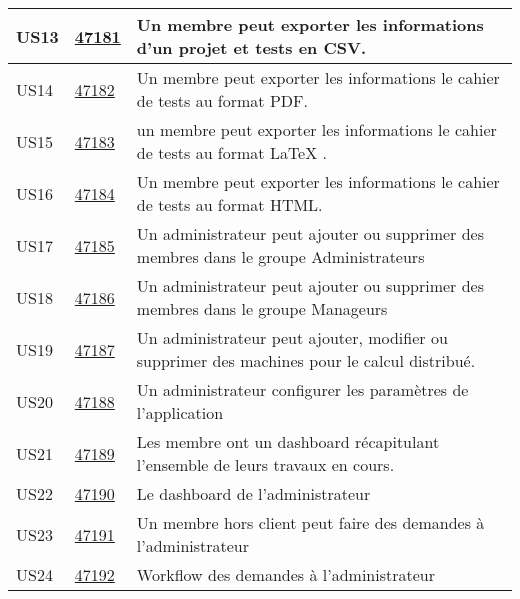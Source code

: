 \begin{center}
\begin{tabular}{|l|p{1.5cm}|p{14cm}|}
        \hline
US13	&	\href{https://redmine-projets.smile.fr/issues/47181}{47181}	&	Un membre peut exporter les informations d'un projet et tests en CSV.	                        \\
        \hline
US14	&	\href{https://redmine-projets.smile.fr/issues/47182}{47182}	&	Un membre peut exporter les informations le cahier de tests au format PDF.	                    \\
        \hline
US15	&	\href{https://redmine-projets.smile.fr/issues/47183}{47183}	&	un membre peut exporter les informations le cahier de tests au format LaTeX .	                \\
        \hline
US16	&	\href{https://redmine-projets.smile.fr/issues/47184}{47184}	&	Un membre peut exporter les informations le cahier de tests au format HTML.	                    \\
        \hline
US17	&	\href{https://redmine-projets.smile.fr/issues/47185}{47185}	&	Un administrateur peut ajouter ou supprimer des membres dans le groupe Administrateurs	        \\
        \hline
US18	&	\href{https://redmine-projets.smile.fr/issues/47186}{47186}	&	Un administrateur peut ajouter ou supprimer des membres dans le groupe Manageurs	            \\
        \hline
US19	&	\href{https://redmine-projets.smile.fr/issues/47187}{47187}	&	Un administrateur peut ajouter, modifier ou supprimer des machines pour le calcul distribué.	\\
        \hline
US20	&	\href{https://redmine-projets.smile.fr/issues/47188}{47188}	&	Un administrateur configurer les paramètres de l'application	                                \\
        \hline
US21	&	\href{https://redmine-projets.smile.fr/issues/47189}{47189}	&	Les membre ont un dashboard récapitulant l'ensemble de leurs travaux en cours.	                \\
        \hline
US22	&	\href{https://redmine-projets.smile.fr/issues/47190}{47190}	&	Le dashboard de l'administrateur	                                                            \\
        \hline
US23	&	\href{https://redmine-projets.smile.fr/issues/47191}{47191}	&	Un membre hors client peut faire des demandes à l'administrateur	                            \\
        \hline
US24	&	\href{https://redmine-projets.smile.fr/issues/47192}{47192}	&	Workflow des demandes à l'administrateur	                                                    \\

\end{tabular}
\end{center}
